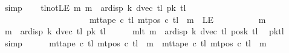 \begin{isabellebody}
\ simp\isanewline
\ \ \isamarkupfalse%
\ tl{\isacharunderscore}{\kern0pt}notLE{\isacharcolon}{\kern0pt}\ {\isachardoublequoteopen}{\isasymAnd}m{\isachardot}{\kern0pt}\ m\ {\isacharless}{\kern0pt}\ ar{\isacharunderscore}{\kern0pt}disp\ {\isacharquery}{\kern0pt}k\ {\isacharparenleft}{\kern0pt}dvec\ {\isacharquery}{\kern0pt}tl{\isacharparenright}{\kern0pt}\ {\isacharparenleft}{\kern0pt}{\isacharquery}{\kern0pt}pk\ {\isacharquery}{\kern0pt}tl{\isacharparenright}{\kern0pt}\isanewline
\ \ \ \ \ \ \ \ \ \ \ \ \ \ \ \ \ \ \ \ {\isasymLongrightarrow}\ mt{\isacharunderscore}{\kern0pt}tape\ c{}\ {\isacharquery}{\kern0pt}tl\ {\isacharparenleft}{\kern0pt}mt{\isacharunderscore}{\kern0pt}pos\ c{}\ {\isacharquery}{\kern0pt}tl\ {\isacharminus}{\kern0pt}\ m{\isacharparenright}{\kern0pt}\ {\isasymnoteq}\ LE{}{\isachardoublequoteclose}\isanewline
\ \ \isamarkupfalse%
\ {\isacharminus}{\kern0pt}\isanewline
\ \ \ \ \isamarkupfalse%
\ m\ \isamarkupfalse%
\ {\isachardoublequoteopen}m\ {\isacharless}{\kern0pt}\ ar{\isacharunderscore}{\kern0pt}disp\ {\isacharquery}{\kern0pt}k\ {\isacharparenleft}{\kern0pt}dvec\ {\isacharquery}{\kern0pt}tl{\isacharparenright}{\kern0pt}\ {\isacharparenleft}{\kern0pt}{\isacharquery}{\kern0pt}pk\ {\isacharquery}{\kern0pt}tl{\isacharparenright}{\kern0pt}{\isachardoublequoteclose}\isanewline
\ \ \ \ \isamarkupfalse%
\ mlt{\isacharcolon}{\kern0pt}\ {\isachardoublequoteopen}m\ {\isacharless}{\kern0pt}\ ar{\isacharunderscore}{\kern0pt}disp\ {\isacharquery}{\kern0pt}k\ {\isacharparenleft}{\kern0pt}dvec\ {\isacharquery}{\kern0pt}tl{\isacharparenright}{\kern0pt}\ {\isacharparenleft}{\kern0pt}posk{}\ {\isacharquery}{\kern0pt}tl{\isacharparenright}{\kern0pt}{\isachardoublequoteclose}\ \isamarkupfalse%
\ pk{\isacharunderscore}{\kern0pt}tl\ \isamarkupfalse%
\ simp\isanewline
\ \ \ \ \isamarkupfalse%
\ {\isachardoublequoteopen}mt{\isacharunderscore}{\kern0pt}tape\ c{}\ {\isacharquery}{\kern0pt}tl\ {\isacharparenleft}{\kern0pt}mt{\isacharunderscore}{\kern0pt}pos\ c{}\ {\isacharquery}{\kern0pt}tl\ {\isacharminus}{\kern0pt}\ m{\isacharparenright}{\kern0pt}\ {\isacharequal}{\kern0pt}\ mt{\isacharunderscore}{\kern0pt}tape\ c{}\ {\isacharquery}{\kern0pt}tl\ {\isacharparenleft}{\kern0pt}mt{\isacharunderscore}{\kern0pt}pos\ c{}\ {\isacharquery}{\kern0pt}tl\ {\isacharminus}{\kern0pt}\ m{\isacharparenright}{\kern0pt}{\isachardoublequoteclose}\isanewline

\end{isabellebody}
